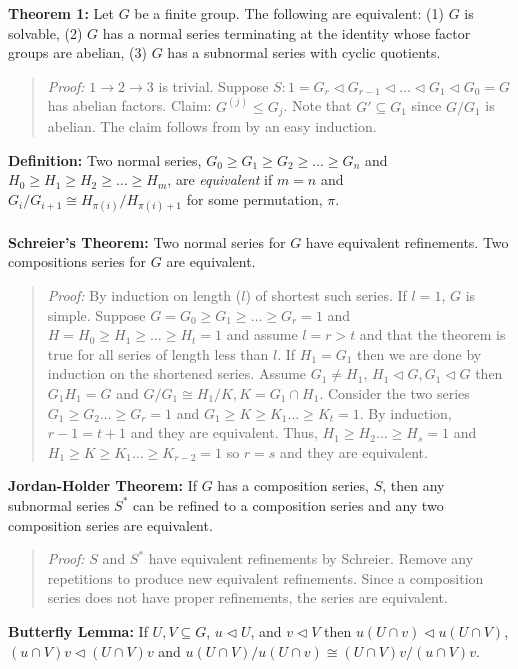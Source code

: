 {\bf Theorem 1:}
Let $G$ be a finite group.  
The following are equivalent: (1) $G$ is solvable, (2) $G$ has a normal series 
terminating at the identity whose factor groups are abelian,
(3) $G$ has a subnormal series with cyclic quotients.
\begin{quote}
\emph{Proof:} $1 \rightarrow 2 \rightarrow 3$ is trivial.  
Suppose $S: 1=G_r \lhd G_{r-1} \lhd \ldots \lhd G_1 \lhd G_0=G$ has abelian factors.
Claim: $G^{(j)} \le G_j$.  Note that $G' \subseteq G_1$ since $G/G_1$ is abelian.  
The claim follows
from by an easy induction.
\end{quote}
{\bf Definition:} Two normal series, 
$G_0 \geq G_1 \geq G_2 \geq \ldots \geq G_n$ and
$H_0 \geq H_1 \geq H_2 \geq \ldots \geq H_m$, are \emph{equivalent} if $m = n$ and
$G_i/G_{i+1} \cong H_{\pi(i)}/H_{\pi(i)+1}$ for some permutation, $\pi$.
\\
\\
{\bf Schreier's Theorem:} Two normal series for $G$ have equivalent refinements.
Two compositions series for $G$ are equivalent.
\begin{quote}
\emph{Proof:}  By induction on length ($l$) of shortest such
series.  If $l=1$, $G$ is simple.
Suppose $G=G_0 \ge G_1 \ge \ldots \ge G_r = 1$ and
$H=H_0 \ge H_1 \ge \ldots \ge H_t = 1$ and assume $l=r>t$ and that the theorem
is true for all series of length less than $l$. If $H_1=G_1$ then we are done by induction
on the shortened series.  Assume $G_1 \ne H_1$, $H_1 \lhd G, G_1 \lhd G$ then
$G_1H_1 = G$ and $G/G_1 \cong H_1/K, K= G_1 \cap H_1$. Consider the two series
$G_1 \ge G_2 \ldots \ge G_r = 1$ and
$G_1 \ge K \ge K_1 \ldots \ge K_t = 1$.  
By induction, $r-1=t+1$ and they are equivalent.
Thus,
$H_1 \ge H_2 \ldots \ge H_s = 1$ and
$H_1 \ge K \ge K_1 \ldots \ge K_{r-2} = 1$ so $r=s$ and they
are equivalent.
\end{quote}
{\bf Jordan-Holder Theorem:} If $G$ has a composition series, $S$,  then any
subnormal series $S^*$ can be refined to a composition series and any two composition series
are equivalent.
\begin{quote}
\emph{Proof:} $S$ and $S^*$ have equivalent refinements by Schreier.  Remove any repetitions to
produce new equivalent refinements.  Since a composition series does not have proper refinements,
the series are equivalent.
\end{quote}
{\bf Butterfly Lemma:} If $U, V  \subseteq G$, $u \lhd U$, and $v \lhd V$ then
$u(U \cap v) \lhd u(U \cap V)$,
$(u \cap V)v \lhd (U \cap V)v$ and 
$u(U \cap V)/u(U \cap v) \cong (U \cap V)v/(u \cap V)v$.
